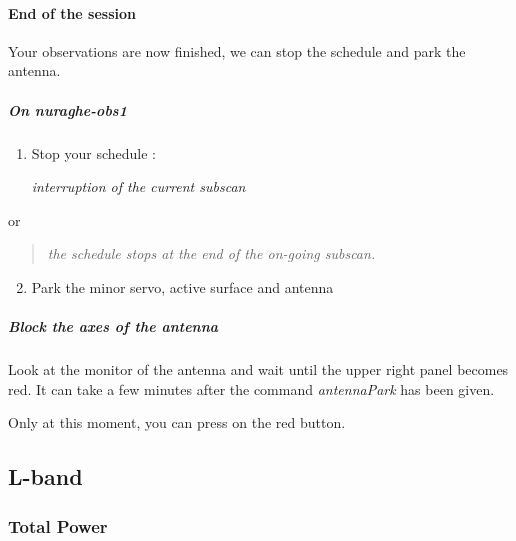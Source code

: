 \documentclass[letterpaper,10pt,english]{sphinxmanual}
\begin{document}
\paragraph{End of the session}
\label{Continuum/K-band/SARDARA/stop-session:end-of-the-session}\label{Continuum/K-band/SARDARA/stop-session::doc}
Your observations are now finished, we can stop the schedule and park
the antenna.


\subparagraph{On nuraghe-obs1}
\label{Continuum/K-band/SARDARA/stop-session:on-nuraghe-obs1}\begin{enumerate}
\item {} 
Stop your schedule :

   \emph{interruption of the current subscan}

\end{enumerate}

or
\begin{quote}

    \emph{the schedule stops at the end of the on-going subscan.}
\end{quote}
\begin{enumerate}
\setcounter{enumi}{1}
\item {} 
Park the minor servo, active surface and antenna





\end{enumerate}


\subparagraph{Block the axes of the antenna}
\label{Continuum/K-band/SARDARA/stop-session:block-the-axes-of-the-antenna}
Look at the monitor of the antenna and wait until the upper right
panel becomes red. It can take a few minutes after the command
\emph{antennaPark} has been given.

Only at this moment, you can press on the red button.


\subsection{L-band}
\label{Continuum/L-band/index:l-band}\label{Continuum/L-band/index::doc}

\subsubsection{Total Power}
\label{Continuum/L-band/TP/index:total-power}\label{Continuum/L-band/TP/index::doc}
\end{document}
